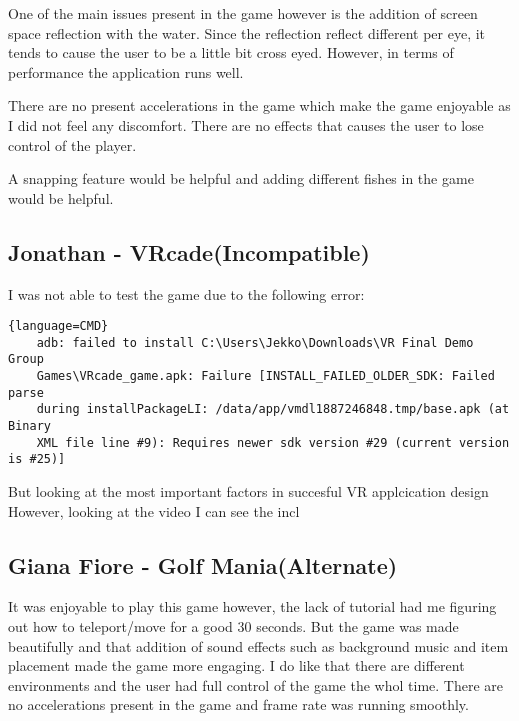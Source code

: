 \documentclass[12pt, twoside]{article}
\begin{document}
One of the main issues present in the game however is the addition of screen
space reflection with the water. Since the reflection reflect different per eye,
it tends to cause the user to be a little bit cross eyed. However, in terms of
performance the application runs well.
\par

There are no present accelerations in the game which make the game enjoyable as
I did not feel any discomfort. There are no effects that causes the user to lose
control of the player. \par

A snapping feature would be helpful and adding different fishes in the game would be helpful.

\subsection{Jonathan - VRcade(Incompatible)}
I was not able to test the game due to the following error: 
\begin{lstlisting}{language=CMD}
    adb: failed to install C:\Users\Jekko\Downloads\VR Final Demo Group
    Games\VRcade_game.apk: Failure [INSTALL_FAILED_OLDER_SDK: Failed parse
    during installPackageLI: /data/app/vmdl1887246848.tmp/base.apk (at Binary
    XML file line #9): Requires newer sdk version #29 (current version is #25)]
\end{lstlisting}
But looking at the most important factors in succesful VR applcication design 
However, looking at the video I can see the incl

\subsection{Giana Fiore - Golf Mania(Alternate)}
It was enjoyable to play this game however, the lack of tutorial had me figuring
out how to teleport/move for a good 30 seconds. But the game was made
beautifully and that addition of sound effects such as background music and item
placement made the game more engaging. I do like that there are different
environments and the user had full control of the game the whol time. There are
no accelerations present in the game and frame rate was running smoothly.
\end{document}
